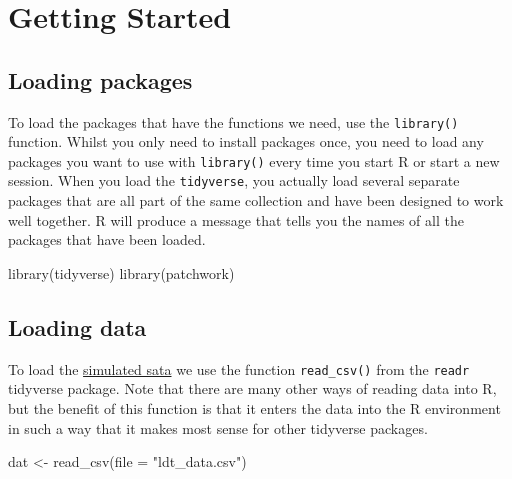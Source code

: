 \documentclass[
  english,
  doc,floatsintext]{apa6}
\newenvironment{Shaded}{\begin{snugshade}}{\end{snugshade}}
\newcommand{\AttributeTok}[1]{\textcolor[rgb]{0.77,0.63,0.00}{#1}}
\newcommand{\FunctionTok}[1]{\textcolor[rgb]{0.00,0.00,0.00}{#1}}
\newcommand{\NormalTok}[1]{#1}
\newcommand{\OtherTok}[1]{\textcolor[rgb]{0.56,0.35,0.01}{#1}}
\newcommand{\StringTok}[1]{\textcolor[rgb]{0.31,0.60,0.02}{#1}}
\begin{document}
\hypertarget{getting-started}{%
\section{Getting Started}\label{getting-started}}

\hypertarget{loading-packages}{%
\subsection{Loading packages}\label{loading-packages}}

To load the packages that have the functions we need, use the \texttt{library()} function. Whilst you only need to install packages once, you need to load any packages you want to use with \texttt{library()} every time you start R or start a new session. When you load the \texttt{tidyverse}, you actually load several separate packages that are all part of the same collection and have been designed to work well together. R will produce a message that tells you the names of all the packages that have been loaded.

\begin{Shaded}
\begin{Highlighting}[]
\FunctionTok{library}\NormalTok{(tidyverse)}
\FunctionTok{library}\NormalTok{(patchwork)}
\end{Highlighting}
\end{Shaded}

\hypertarget{loading-data}{%
\subsection{Loading data}\label{loading-data}}

To load the \href{https://osf.io/bj83f/files/}{simulated sata} we use the function \texttt{read\_csv()} from the \texttt{readr} tidyverse package. Note that there are many other ways of reading data into R, but the benefit of this function is that it enters the data into the R environment in such a way that it makes most sense for other tidyverse packages.

\begin{Shaded}
\begin{Highlighting}[]
\NormalTok{dat }\OtherTok{\textless{}{-}} \FunctionTok{read\_csv}\NormalTok{(}\AttributeTok{file =} \StringTok{"ldt\_data.csv"}\NormalTok{)}
\end{Highlighting}
\end{Shaded}
\end{document}
